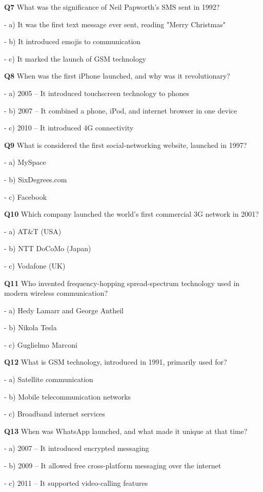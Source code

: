 \textbf{Q7} What was the significance of Neil Papworth's SMS sent in 1992?\par
\quad - a) It was the first text message ever sent, reading "Merry Christmas"\par
\quad - b) It introduced emojis to communication\par
\quad - c) It marked the launch of GSM technology\par

\textbf{Q8} When was the first iPhone launched, and why was it revolutionary?\par
\quad - a) 2005 – It introduced touchscreen technology to phones\par
\quad - b) 2007 – It combined a phone, iPod, and internet browser in one device\par
\quad - c) 2010 – It introduced 4G connectivity\par

\textbf{Q9} What is considered the first social-networking website, launched in 1997?\par
\quad - a) MySpace\par
\quad - b) SixDegrees.com\par
\quad - c) Facebook\par

\textbf{Q10} Which company launched the world's first commercial 3G network in 2001?\par
\quad - a) AT&T (USA)\par
\quad - b) NTT DoCoMo (Japan)\par
\quad - c) Vodafone (UK)\par

\textbf{Q11} Who invented frequency-hopping spread-spectrum technology used in modern wireless communication?\par
\quad - a) Hedy Lamarr and George Antheil\par
\quad - b) Nikola Tesla\par
\quad - c) Guglielmo Marconi\par

\textbf{Q12} What is GSM technology, introduced in 1991, primarily used for?\par
\quad - a) Satellite communication\par
\quad - b) Mobile telecommunication networks\par
\quad - c) Broadband internet services\par

\textbf{Q13} When was WhatsApp launched, and what made it unique at that time?\par
\quad - a) 2007 – It introduced encrypted messaging\par
\quad - b) 2009 – It allowed free cross-platform messaging over the internet\par
\quad - c) 2011 – It supported video-calling features\par

